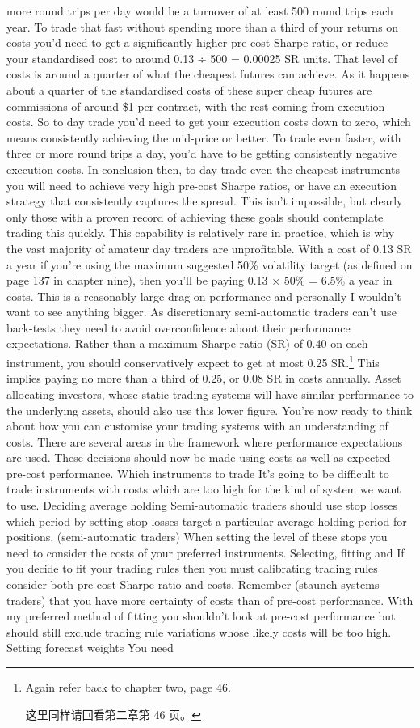 more round trips per day would be a turnover of at least 500 round trips each year. To trade that fast without spending more than a third of your returns on costs you'd need to get a significantly higher pre-cost Sharpe ratio, or reduce your standardised cost to around 0.13 ÷ 500 = 0.00025 SR units. That level of costs is around a quarter of what the cheapest futures can achieve. As it happens about a quarter of the standardised costs of these super cheap futures are commissions of around \$1 per contract, with the rest coming from execution costs. So to day trade you'd need to get your execution costs down to zero, which means consistently achieving the mid-price or better. To trade even faster, with three or more round trips a day, you'd have to be getting consistently negative execution costs. In conclusion then, to day trade even the cheapest instruments you will need to achieve very high pre-cost Sharpe ratios, or have an execution strategy that consistently captures the spread. This isn't impossible, but clearly only those with a proven record of achieving these goals should contemplate trading this quickly. This capability is relatively rare in practice, which is why the vast majority of amateur day traders are unprofitable. With a cost of 0.13 SR a year if you're using the maximum suggested 50\% volatility target (as defined on page 137 in chapter nine), then you'll be paying 0.13 × 50\% = 6.5\% a year in costs. This is a reasonably large drag on performance and personally I wouldn't want to see anything bigger. As discretionary semi-automatic traders can't use back-tests they need to avoid overconfidence about their performance expectations. Rather than a maximum Sharpe ratio (SR) of 0.40 on each instrument, you should conservatively expect to get at most 0.25 SR.\footnote{Again refer back to chapter two, page 46. \par 这里同样请回看第二章第 46 页。} This implies paying no more than a third of 0.25, or 0.08 SR in costs annually. Asset allocating investors, whose static trading systems will have similar performance to the underlying assets, should also use this lower figure. You're now ready to think about how you can customise your trading systems with an understanding of costs. There are several areas in the framework where performance expectations are used. These decisions should now be made using costs as well as expected pre-cost performance. Which instruments to trade It's going to be difficult to trade instruments with costs which are too high for the kind of system we want to use. Deciding average holding Semi-automatic traders should use stop losses which period by setting stop losses target a particular average holding period for positions. (semi-automatic traders) When setting the level of these stops you need to consider the costs of your preferred instruments. Selecting, fitting and If you decide to fit your trading rules then you must calibrating trading rules consider both pre-cost Sharpe ratio and costs. Remember (staunch systems traders) that you have more certainty of costs than of pre-cost performance. With my preferred method of fitting you shouldn't look at pre-cost performance but should still exclude trading rule variations whose likely costs will be too high. Setting forecast weights You need 